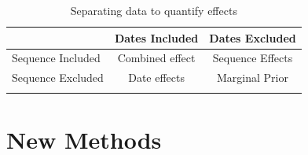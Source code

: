 \documentclass{article}
\begin{document}
\begin{table}[H]
\centering
\caption{Separating data to quantify effects}
\begin{tabular}{lcc}
                                    &   Dates Included                  &   Dates Excluded    \\
\midrule
Sequence Included                   &   Combined effect                 &   Sequence Effects            \\
Sequence Excluded                   &   Date effects                    &   Marginal Prior     \\
\bottomrule 
\label{tab:tab1}
\end{tabular}
\end{table}

\section*{New Methods}
\end{document}
